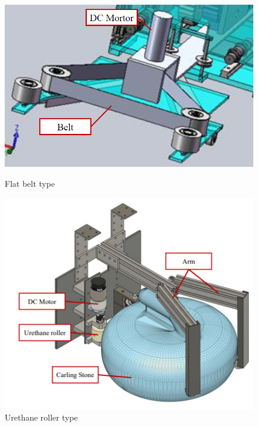 \documentclass{classes/sice-si}
\begin{document}
\begin{figure}[h]
    \centering
    \vspace{4pt} %
    \begin{minipage}{0.4\linewidth}
        \centering
        \includegraphics[width=\linewidth]{figures/1.png}
        \caption{Flat belt type}
        \label{fig:one}
    \end{minipage}
    \hfill
    \begin{minipage}{0.4\linewidth}
        \centering
        \includegraphics[width=\linewidth]{figures/2.png}
        \caption{Urethane roller type}
        \label{fig:two}
    \end{minipage}
    \hfill
    \begin{minipage}{0.4\linewidth}

\end{minipage}
\end{figure}
\end{document}
